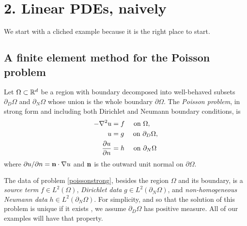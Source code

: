 
\chapter{2. Linear PDEs, naively}

We start with a cliched example because it is the right place to start.

\section{A finite element method for the Poisson problem}

Let $\Omega \subset \mathbb{R}^d$ be a region with boundary decomposed into well-behaved subsets $\partial_D \Omega$ and $\partial_N \Omega$ whose union is the whole boundary $\partial \Omega$.  The \emph{Poisson problem}, in strong form and including both Dirichlet and Neumann boundary conditions, is
\begin{align}
- \nabla^2 u &= f \quad \text{ on } \Omega, \label{poissonstrong} \\
u &= g \quad \text{ on } \partial_D \Omega, \notag \\
\frac{\partial u}{\partial n} &= h \quad \text{ on } \partial_N \Omega \notag
\end{align}
where $\partial u/\partial n = \mathbf{n} \cdot \nabla u$ and $\mathbf{n}$ is the outward unit normal on $\partial \Omega$.

The data of problem \eqref{poissonstrong}, besides the region $\Omega$ and its boundary, is a \emph{source term} $f\in L^2(\Omega)$, \emph{Dirichlet data} $g\in L^2(\partial_N \Omega)$, and \emph{non-homogeneous Neumann data} $h\in L^2(\partial_N \Omega)$.  For simplicity, and so that the solution of this problem is unique if it exists \citep{Elmanetal2005}, we assume $\partial_D \Omega$ has positive measure.  All of our examples will have that property.

